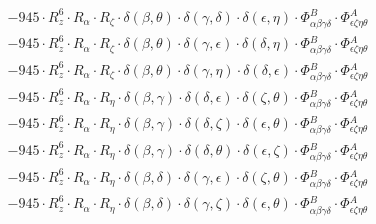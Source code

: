 \documentclass{article}
\begin{document}
\begin{equation}
\begin{array}{c}
 \\[0.2em] 		 - 945 \cdot R_{z}^{6} \cdot R_{\alpha{}} \cdot R_{\zeta{}} \cdot \delta{}\left(\beta{}, \theta{}\right) \cdot \delta{}\left(\gamma{}, \delta{}\right) \cdot \delta{}\left(\epsilon{}, \eta{}\right) \cdot \Phi{}^{B}_{\alpha{}\beta{}\gamma{}\delta{}} \cdot \Phi{}^{A}_{\epsilon{}\zeta{}\eta{}\theta{}} 
 \\[0.2em] 		 - 945 \cdot R_{z}^{6} \cdot R_{\alpha{}} \cdot R_{\zeta{}} \cdot \delta{}\left(\beta{}, \theta{}\right) \cdot \delta{}\left(\gamma{}, \epsilon{}\right) \cdot \delta{}\left(\delta{}, \eta{}\right) \cdot \Phi{}^{B}_{\alpha{}\beta{}\gamma{}\delta{}} \cdot \Phi{}^{A}_{\epsilon{}\zeta{}\eta{}\theta{}} 
 \\[0.2em] 		 - 945 \cdot R_{z}^{6} \cdot R_{\alpha{}} \cdot R_{\zeta{}} \cdot \delta{}\left(\beta{}, \theta{}\right) \cdot \delta{}\left(\gamma{}, \eta{}\right) \cdot \delta{}\left(\delta{}, \epsilon{}\right) \cdot \Phi{}^{B}_{\alpha{}\beta{}\gamma{}\delta{}} \cdot \Phi{}^{A}_{\epsilon{}\zeta{}\eta{}\theta{}} 
 \\[0.2em] 		 - 945 \cdot R_{z}^{6} \cdot R_{\alpha{}} \cdot R_{\eta{}} \cdot \delta{}\left(\beta{}, \gamma{}\right) \cdot \delta{}\left(\delta{}, \epsilon{}\right) \cdot \delta{}\left(\zeta{}, \theta{}\right) \cdot \Phi{}^{B}_{\alpha{}\beta{}\gamma{}\delta{}} \cdot \Phi{}^{A}_{\epsilon{}\zeta{}\eta{}\theta{}} 
 \\[0.2em] 		 - 945 \cdot R_{z}^{6} \cdot R_{\alpha{}} \cdot R_{\eta{}} \cdot \delta{}\left(\beta{}, \gamma{}\right) \cdot \delta{}\left(\delta{}, \zeta{}\right) \cdot \delta{}\left(\epsilon{}, \theta{}\right) \cdot \Phi{}^{B}_{\alpha{}\beta{}\gamma{}\delta{}} \cdot \Phi{}^{A}_{\epsilon{}\zeta{}\eta{}\theta{}} 
 \\[0.2em] 		 - 945 \cdot R_{z}^{6} \cdot R_{\alpha{}} \cdot R_{\eta{}} \cdot \delta{}\left(\beta{}, \gamma{}\right) \cdot \delta{}\left(\delta{}, \theta{}\right) \cdot \delta{}\left(\epsilon{}, \zeta{}\right) \cdot \Phi{}^{B}_{\alpha{}\beta{}\gamma{}\delta{}} \cdot \Phi{}^{A}_{\epsilon{}\zeta{}\eta{}\theta{}} 
 \\[0.2em] 		 - 945 \cdot R_{z}^{6} \cdot R_{\alpha{}} \cdot R_{\eta{}} \cdot \delta{}\left(\beta{}, \delta{}\right) \cdot \delta{}\left(\gamma{}, \epsilon{}\right) \cdot \delta{}\left(\zeta{}, \theta{}\right) \cdot \Phi{}^{B}_{\alpha{}\beta{}\gamma{}\delta{}} \cdot \Phi{}^{A}_{\epsilon{}\zeta{}\eta{}\theta{}} 
 \\[0.2em] 		 - 945 \cdot R_{z}^{6} \cdot R_{\alpha{}} \cdot R_{\eta{}} \cdot \delta{}\left(\beta{}, \delta{}\right) \cdot \delta{}\left(\gamma{}, \zeta{}\right) \cdot \delta{}\left(\epsilon{}, \theta{}\right) \cdot \Phi{}^{B}_{\alpha{}\beta{}\gamma{}\delta{}} \cdot \Phi{}^{A}_{\epsilon{}\zeta{}\eta{}\theta{}} 

\end{array}
\end{equation}
\end{document}
